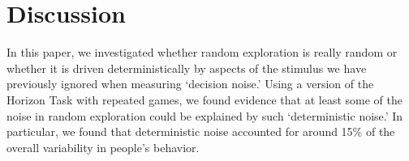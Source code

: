 \documentclass[12pt]{article}
\begin{document}
{%





\section*{Discussion}



In this paper, we investigated whether random exploration is really random or whether it is driven deterministically by aspects of the stimulus we have previously ignored when measuring `decision noise.'  Using a version of the Horizon Task with repeated games, we found evidence that at least some of the noise in random exploration could be explained by such `deterministic noise.' In particular, we found that deterministic noise accounted for around 15\% of the overall variability in people's behavior. 

}
\end{document}
